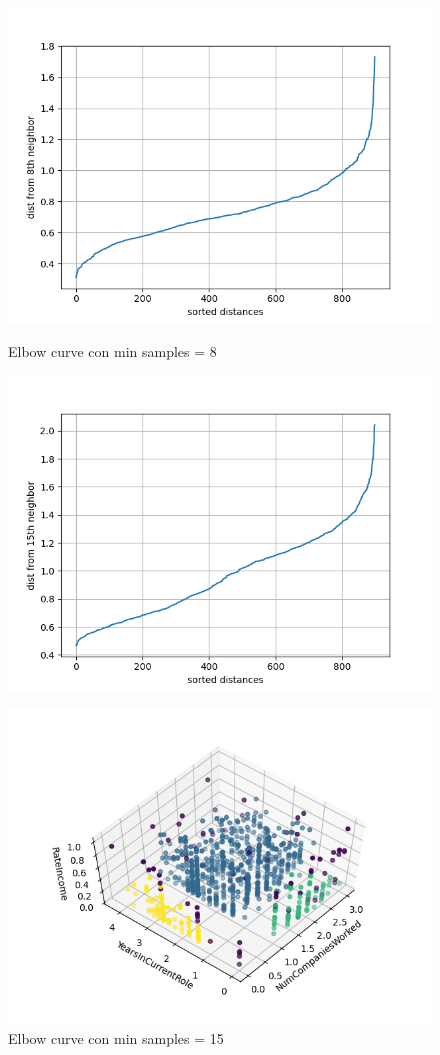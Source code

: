 \documentclass[a4paper,9pt]{article}
\begin{document}
\begin{figure}[H]
\begin{minipage}[b]{0.45\textwidth}
\centering
\includegraphics[width=\textwidth]{2.png}
\caption{Elbow curve con min samples =  8}
\label{etichetta1}
\centering
\includegraphics[width=\textwidth]{5 (1).png}
\caption{Elbow curve con min samples =  15}
\label{etichetta1}
\end{minipage}
\hfill
\begin{minipage}[b]{0.45\textwidth}
\centering
\includegraphics[width=\textwidth]{22.png}

\end{minipage}
\end{figure}
\end{document}
